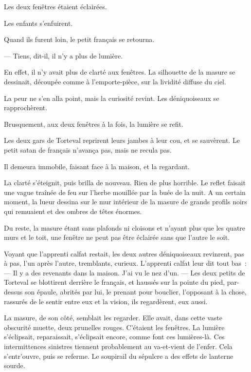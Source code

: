 \documentclass[french,twoside]{book} %
\begin{document}
Les deux fenêtres étaient éclairées.\par
Les enfants s’enfuirent.\par
Quand ils furent loin, le petit français se retourna.\par
 — Tiens, dit-il, il n’y a plus de lumière.\par
En effet, il n’y avait plus de clarté aux fenêtres. La silhouette de la masure se dessinait, découpée comme à l’emporte-pièce, sur la lividité diffuse du ciel.\par
La peur ne s’en alla point, mais la curiosité revint. Les déniquoiseaux se rapprochèrent.\par
Brusquement, aux deux fenêtres à la fois, la lumière se refit.\par
Les deux gars de Torteval reprirent leurs jambes à leur cou, et se sauvèrent. Le petit satan de français n’avança pas, mais ne recula pas.\par
Il demeura immobile, faisant face à la maison, et la regardant.\par
La clarté s’éteignit, puis brilla de nouveau. Rien de plus horrible. Le reflet faisait une vague traînée de feu sur l’herbe mouillée par la buée de la nuit. A un certain moment, la lueur dessina sur le mur intérieur de la masure de grands profils noirs qui remuaient et des ombres de têtes énormes.\par
Du reste, la masure étant sans plafonds ni cloisons et n’ayant plus que les quatre murs et le toit, une fenêtre ne peut pas être éclairée sans que l’autre le soit.\par
Voyant que l’apprenti calfat restait, les deux autres déniquoiseaux revinrent, pas à pas, l’un après l’autre, tremblants, curieux. L’apprenti calfat leur dit tout bas : — Il y a des revenants dans la maison. J’ai vu le nez d’un. — Les deux petits de Torteval se blottirent derrière le français, et haussés sur la pointe du pied, par-dessus son épaule, abrités par lui, le prenant pour  bouclier, l’opposant à la chose, rassurés de le sentir entre eux et la vision, ils regardèrent, eux aussi.\par
La masure, de son côté, semblait les regarder. Elle avait, dans cette vaste obscurité muette, deux prunelles rouges. C’étaient les fenêtres. La lumière s’éclipsait, reparaissait, s’éclipsait encore, comme font ces lumières-là. Ces intermittences sinistres tiennent probablement au va-et-vient de l’enfer. Cela s’entr’ouvre, puis se referme. Le soupirail du sépulcre a des effets de lanterne sourde.\par
\end{document}
